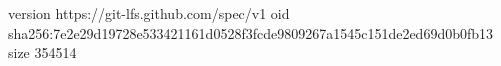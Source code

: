 version https://git-lfs.github.com/spec/v1
oid sha256:7e2e29d19728e533421161d0528f3fcde9809267a1545c151de2ed69d0b0fb13
size 354514
